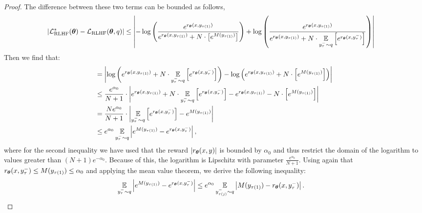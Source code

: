 \begin{proof}
The difference between these two terms can be bounded as follows,
\begin{equation*}
\begin{aligned}
&\left|\mathcal{L}_{\text{RLHF}}^{*}({\boldsymbol{\theta}})-\mathcal{L}_{\text{RLHF}}({\boldsymbol{\theta}},q)\right|\leq
\left|-\log\left(\frac{e^{{ r_{{\boldsymbol{\theta}}}(x,y_{\tau\left( 1\right)})}}}{e^{{ r_{{\boldsymbol{\theta}}}(x,y_{\tau\left( 1\right)})}}+N\cdot \left[e^{M(y_{\tau\left(1\right)})}\right]}\right)+\log\left(\frac{e^{{ r_{{\boldsymbol{\theta}}}(x,y_{\tau\left( 1\right)})}}}{e^{{ r_{{\boldsymbol{\theta}}}(x,y_{\tau\left(1\right)})}}+N\cdot \operatorname*{\mathbb{E}}\limits_{y^{-}_{\tau}\sim q}\left[e^{{r_{{\boldsymbol{\theta}}}(x,y^{-}_{\tau})}}\right]}\right)\right|
\end{aligned}
\end{equation*}
Then we find that:
\begin{equation*}
\begin{aligned}
&= \left|\log\left(e^{{ r_{{\boldsymbol{\theta}}}(x,y_{\tau\left( 1\right)})}}+N\cdot \operatorname*{\mathbb{E}}\limits_{y^{-}_{\tau}\sim q}\left[e^{{r_{{\boldsymbol{\theta}}}(x,y^{-}_{\tau})}}\right]\right)-\log\left(e^{{ r_{{\boldsymbol{\theta}}}(x,y_{\tau\left( 1\right)})}}+N\cdot \left[e^{M(y_{\tau\left(1\right)})}\right]\right)\right| \\
&\leq \frac{e^{\alpha_{0}}}{N+1}\cdot\left|e^{{ r_{{\boldsymbol{\theta}}}(x,y_{\tau\left( 1\right)})}}+N\cdot \operatorname*{\mathbb{E}}\limits_{y^{-}_{\tau}\sim q}\left[e^{{r_{{\boldsymbol{\theta}}}(x,y^{-}_{\tau})}}\right]-e^{{ r_{{\boldsymbol{\theta}}}(x,y_{\tau\left( 1\right)})}}-N\cdot \left[e^{M(y_{\tau\left(1\right)})}\right]\right| \\
&= \frac{Ne^{\alpha_{0}}}{N+1}\cdot\left|\operatorname*{\mathbb{E}}\limits_{y^{-}_{\tau}\sim q}\left[e^{{r_{{\boldsymbol{\theta}}}(x,y^{-}_{\tau})}}\right]-e^{M(y_{\tau\left(1\right)})}\right| \\
&\leq e^{\alpha_{0}}\operatorname*{\mathbb{E}}\limits_{y^{-}_{\tau}\sim q}\left|e^{M(y_{\tau\left(1\right)})}-e^{{r_{{\boldsymbol{\theta}}}(x,y^{-}_{\tau})}}\right|,
\end{aligned}
\end{equation*}
where for the second inequality we have used  that the reward $|r_{{\boldsymbol{\theta}}}(x, y)|$ is bounded by $\alpha_{0}$ and thus restrict the domain of the logarithm to values greater than $(N+1)e^{-\alpha_{0}}$. Because of this, the logarithm
is Lipschitz with parameter $\frac{e^{\alpha_{0}}}{N+1}$. Using again  that ${r_{{\boldsymbol{\theta}}}(x,y^{-}_{\tau})}\leq M(y_{\tau\left(1\right)})\leq\alpha_{0}$ and applying the mean value theorem, we derive the following inequality:
\begin{equation*}
\begin{aligned}
&\expectation\limits_{y^{-}_{\tau}\sim q}\left|e^{M(y_{\tau\left(1\right)})}-e^{{r_{\wm}(x,y^{-}_{\tau})}}\right|\leq e^{\alpha_{0}}\expectation\limits_{y^{-}_{\tau\left(j\right)}\sim q}\left|M(y_{\tau\left(1\right)})-r_{\wm}(x,y^{-}_{\tau})\right|.

\end{aligned}
\end{equation*}
\end{proof}
